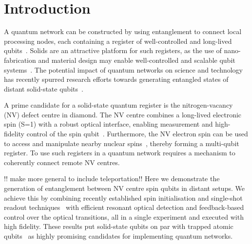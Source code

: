
\clearpage

\section{Introduction}

A quantum network can be constructed by using entanglement to connect local processing nodes, each containing a register of well-controlled and long-lived qubits~\cite{Kimble_Nature_2008}. Solids are an attractive platform for such registers, as the use of nano-fabrication and material design may enable well-controlled and scalable qubit systems~\cite{Ladd_Nature_2010}. The potential impact of quantum networks on science and technology has recently spurred research efforts towards generating entangled states of distant solid-state qubits~\cite{Togan_Nature_2010,Gao_Nature_2012,DeGreve_Nature_2012,Bernien_Phys.Rev.Lett._2012,Sipahigil_Phys.Rev.Lett._2012,Patel_NatPhoton_2010,Flagg_Phys.Rev.Lett._2010}.

A prime candidate for a solid-state quantum register is the nitrogen-vacancy (NV) defect centre in diamond. The NV centre combines a long-lived electronic spin (S=1) with a robust optical interface, enabling measurement and high-fidelity control of the spin qubit~\cite{Togan_Nature_2010,Fuchs_Science_2009,Lange_Science_2010,vanderSar_Nature_2012}. Furthermore, the NV electron spin can be used to access and manipulate nearby nuclear spins~\cite{Robledo_Nature_2011,Neumann_Science_2010,Neumann_Science_2008,Maurer_Science_2012,Pfaff_NatPhys_2013}, thereby forming a multi-qubit register. To use such registers in a quantum network requires a mechanism to coherently connect remote NV centres.

!! make more general to include teleportation!! Here we demonstrate the generation of entanglement between NV centre spin qubits in distant setups. We achieve this by combining recently established spin initialisation and single-shot readout techniques~\cite{Robledo_Nature_2011} with efficient resonant optical detection and feedback-based control over the optical transitions, all in a single experiment and executed with high fidelity. These results put solid-state qubits on par with trapped atomic qubits~\cite{Moehring_Nature_2007,Ritter_Nature_2012,Hofmann_Science_2012} as highly promising candidates for implementing quantum networks.

